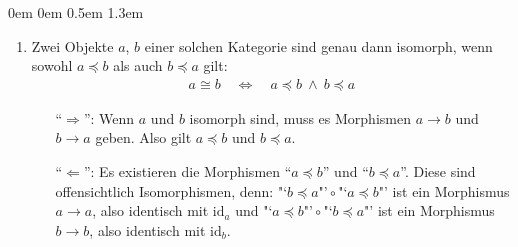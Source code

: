 \documentclass[a4paper,ngerman]{scrartcl}
\theoremstyle{definition}
\theoremstyle{plain}
\theoremstyle{remark}
\newcommand{\id}{\mathrm{id}}
\begin{document}
\begin{list}{}{0em \leftmargin0em \itemindent0.5em \itemsep 1.3em}
\begin{enumerate}
\item
Zwei Objekte $a$, $b$ einer solchen Kategorie sind genau dann isomorph, wenn sowohl $a\preceq b$ als auch $b\preceq a$ gilt:
\begin{align*}
a\cong b \quad \Longleftrightarrow \quad a\preceq b \ \wedge\ b \preceq a
\end{align*}
\begin{itemize}
\item["`$\Rightarrow$"':] Wenn $a$ und $b$ isomorph sind, muss es Morphismen $a\to b$ und $b\to a$ geben. Also gilt $a\preceq b$ und $b\preceq a$.
\item["`$\Leftarrow$"':] Es existieren die Morphismen "`$a\preceq b$"' und "`$b\preceq a$"'. Diese sind offensichtlich Isomorphismen, denn: $\text{"`$b\preceq a$"'}\circ\text{"`$a\preceq b$"'}$ ist ein Morphismus $a\to a$, also identisch mit $\id_a$ und $\text{"`$a\preceq b$"'}\circ\text{"`$b\preceq a$"'}$ ist ein Morphismus $b\to b$, also identisch mit $\id_b$.
\end{itemize}



\end{enumerate}
\end{list}
\end{document}
